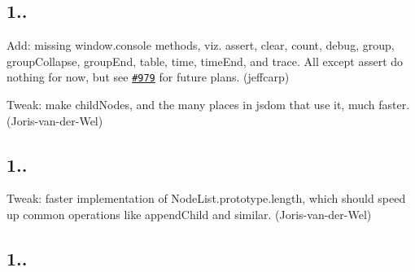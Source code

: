 \subsection*{1..}


\begin{DoxyItemize}
\item Add\+: missing {\ttfamily window.\+console} methods, viz. {\ttfamily assert}, {\ttfamily clear}, {\ttfamily count}, {\ttfamily debug}, {\ttfamily group}, {\ttfamily group\+Collapse}, {\ttfamily group\+End}, {\ttfamily table}, {\ttfamily time}, {\ttfamily time\+End}, and {\ttfamily trace}. All except {\ttfamily assert} do nothing for now, but see \href{https://github.com/tmpvar/jsdom/issues/979}{\tt \#979} for future plans. (jeffcarp)
\item Tweak\+: make {\ttfamily child\+Nodes}, and the many places in jsdom that use it, much faster. (Joris-\/van-\/der-\/\+Wel)
\end{DoxyItemize}

\subsection*{1..}


\begin{DoxyItemize}
\item Tweak\+: faster implementation of {\ttfamily Node\+List.\+prototype.\+length}, which should speed up common operations like {\ttfamily append\+Child} and similar. (Joris-\/van-\/der-\/\+Wel)
\end{DoxyItemize}

\subsection*{1..}


